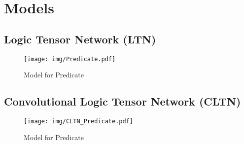 
\section{Models}

\subsection{Logic Tensor Network (LTN)}

\begin{figure}
    \centering
    \texttt{[image: img/Predicate.pdf]}
    \caption{Model for Predicate}
    \label{fig:LTN_predicate}
\end{figure}

\subsection{Convolutional Logic Tensor Network (CLTN)}

\begin{figure}
    \centering
    \texttt{[image: img/CLTN\_Predicate.pdf]}
    \caption{Model for Predicate}
    \label{fig:CLTN_predicate}
\end{figure}
